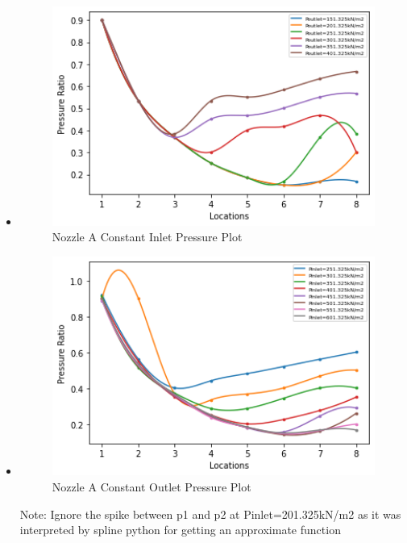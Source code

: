 \newpage
\begin{itemize}
    \item {}
    
    \begin{figure}[!h]
    \centering
    \includegraphics[width=12cm]{figure 1.png}
    \caption{Nozzle A Constant Inlet Pressure Plot}
\end{figure}

    \item {}
     \begin{figure}[!h]
    \centering
    \includegraphics[width=12cm]{figure 2.png}
    \caption{Nozzle A Constant Outlet Pressure Plot}
\end{figure}
\newline
{\tiny Note: Ignore the spike between p1 and p2 at Pinlet=201.325kN/m2 as it was interpreted by spline python for getting an approximate function}


\end{itemize}
